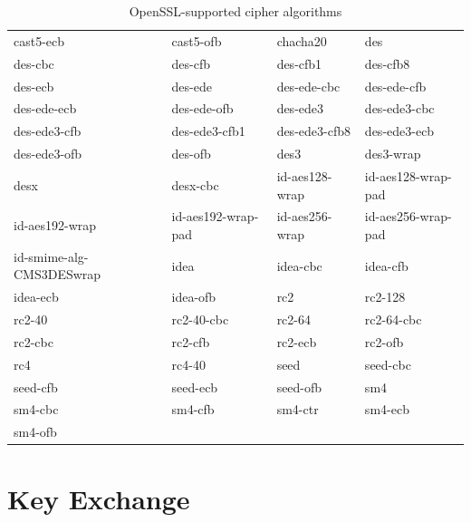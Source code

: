 \documentclass[a4paper, 12pt]{book} %
\begin{document}
\begin{table}[H]
\begin{tabular}{llll}
cast5-ecb & cast5-ofb & chacha20 & des \\
des-cbc & des-cfb & des-cfb1 & des-cfb8 \\
des-ecb & des-ede & des-ede-cbc & des-ede-cfb \\
des-ede-ecb & des-ede-ofb & des-ede3 & des-ede3-cbc \\
des-ede3-cfb & des-ede3-cfb1 & des-ede3-cfb8 & des-ede3-ecb \\
des-ede3-ofb & des-ofb & des3 & des3-wrap \\
desx & desx-cbc & id-aes128-wrap & id-aes128-wrap-pad \\
id-aes192-wrap & id-aes192-wrap-pad & id-aes256-wrap & id-aes256-wrap-pad \\
id-smime-alg-CMS3DESwrap & idea & idea-cbc & idea-cfb \\
idea-ecb & idea-ofb & rc2 & rc2-128 \\
rc2-40 & rc2-40-cbc & rc2-64 & rc2-64-cbc \\
rc2-cbc & rc2-cfb & rc2-ecb & rc2-ofb \\
rc4 & rc4-40 & seed & seed-cbc \\
seed-cfb & seed-ecb & seed-ofb & sm4 \\
sm4-cbc & sm4-cfb & sm4-ctr & sm4-ecb \\
sm4-ofb & & & \\
\hline
\end{tabular}
\caption{OpenSSL-supported cipher algorithms}
\end{table}



\section{Key Exchange}
\end{document}
